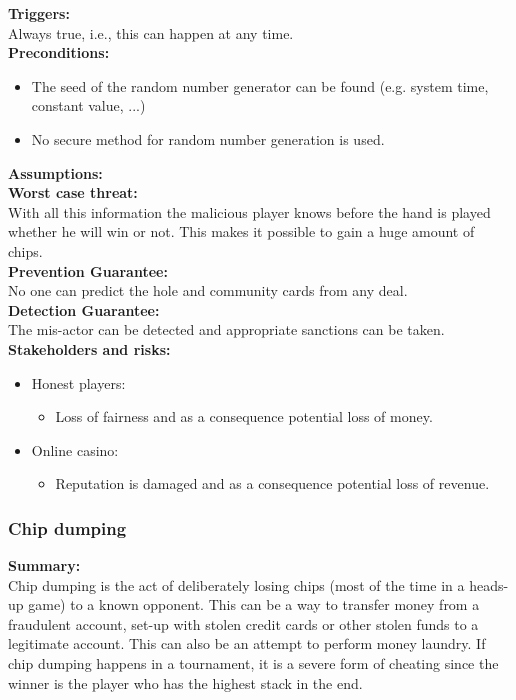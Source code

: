 \documentclass[a4paper,11pt]{report}
\begin{document}
\textbf{Triggers:}\\
Always true, i.e., this can happen at any time. \\
\textbf{Preconditions:}
\begin{itemize}
\item The seed of the random number generator can be found (e.g. system time, constant value, ...)
\item No secure method for random number generation is used.
\end{itemize}
\textbf{Assumptions:} \\
\textbf{Worst case threat:}\\
With all this information the malicious player knows before the hand is played whether he will win or not. This makes it possible to gain a huge amount of chips.\\
\textbf{Prevention Guarantee:} \\
No one can predict the hole and community cards from any deal. \\
\textbf{Detection Guarantee:} \\
The mis-actor can be detected and appropriate sanctions can be taken. \\
\textbf{Stakeholders and risks:}
\begin{itemize}
\item Honest players:
\begin{itemize}
\item Loss of fairness and as a consequence potential loss of money.
\end{itemize}
\item Online casino:
\begin{itemize}
\item Reputation is damaged and as a consequence potential loss of revenue.
\end{itemize}
\end{itemize}

\subsubsection{Chip dumping}
\textbf{Summary:} \\
Chip dumping is the act of deliberately losing chips (most of the time in a heads-up game) to a known opponent. This can be a way to transfer money from a fraudulent account, set-up with stolen credit cards or other stolen funds to a legitimate account. This can also be an attempt to perform money laundry. If chip dumping happens in a tournament, it is a severe form of cheating since the winner is the player who has the highest stack in the end.
\end{document}
